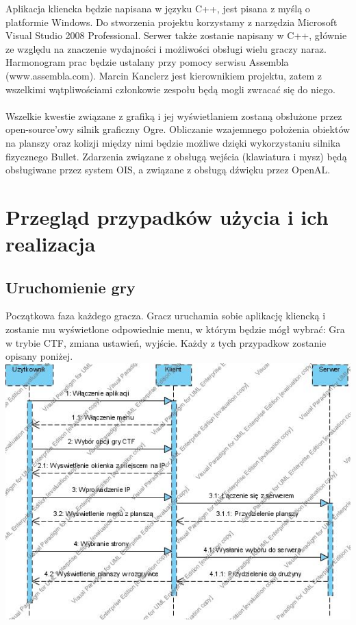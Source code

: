 \documentclass[12pt,a4paper,twoside]{article}
\begin{document}
Aplikacja kliencka będzie napisana w języku C++, jest pisana z myślą o platformie Windows. Do stworzenia projektu korzystamy z narzędzia Microsoft Visual Studio 2008 Professional. Serwer także zostanie napisany w C++, głównie ze względu na znaczenie wydajności i możliwości obsługi wielu graczy naraz. Harmonogram prac będzie ustalany przy pomocy serwisu Assembla (www.assembla.com). Marcin Kanclerz jest kierownikiem projektu, zatem z wszelkimi wątpliwościami członkowie zespołu będą mogli zwracać się do niego.\\
\\
Wszelkie kwestie związane z grafiką i jej wyświetlaniem zostaną obsłużone przez open-source'owy silnik graficzny Ogre. Obliczanie wzajemnego położenia obiektów na planszy oraz kolizji między nimi będzie możliwe dzięki wykorzystaniu silnika fizycznego Bullet. Zdarzenia związane z obsługą wejścia (klawiatura i mysz) będą obsługiwane przez system OIS, a związane z obsługą dźwięku przez OpenAL.

\section{Przegląd przypadków użycia i ich realizacja}


\subsection{Uruchomienie gry}
Początkowa faza każdego gracza. Gracz uruchamia sobie aplikację kliencką i zostanie mu wyświetlone odpowiednie menu, w którym będzie mógł wybrać: Gra w trybie CTF, zmiana ustawień, wyjście. Każdy z tych przypadkow zostanie opisany poniżej.
\\
\includegraphics[angle=90]{pics/WejscieDoGry.jpg}
\end{document}
